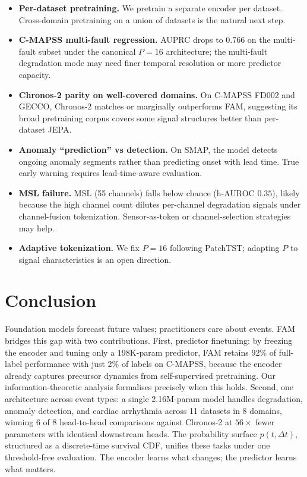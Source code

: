 \documentclass{article}
\begin{document}
\begin{itemize}[nosep]
  \item \textbf{Per-dataset pretraining.} We pretrain a separate encoder per dataset. Cross-domain pretraining on a union of datasets is the natural next step.
  \item \textbf{C-MAPSS multi-fault regression.} AUPRC drops to $0.766$ on the multi-fault subset under the canonical $P{=}16$ architecture; the multi-fault degradation mode may need finer temporal resolution or more predictor capacity.
  \item \textbf{Chronos-2 parity on well-covered domains.} On C-MAPSS FD002 and GECCO, Chronos-2 matches or marginally outperforms FAM, suggesting its broad pretraining corpus covers some signal structures better than per-dataset JEPA.
  \item \textbf{Anomaly ``prediction'' vs detection.} On SMAP, the model detects ongoing anomaly segments rather than predicting onset with lead time. True early warning requires lead-time-aware evaluation.
  \item \textbf{MSL failure.} MSL (55 channels) falls below chance (h-AUROC $0.35$), likely because the high channel count dilutes per-channel degradation signals under channel-fusion tokenization. Sensor-as-token or channel-selection strategies may help.
  \item \textbf{Adaptive tokenization.} We fix $P{=}16$ following PatchTST; adapting $P$ to signal characteristics is an open direction.
\end{itemize}

\section{Conclusion}

Foundation models forecast future values; practitioners care about events. FAM bridges this gap with two contributions. First, predictor finetuning: by freezing the encoder and tuning only a 198K-param predictor, FAM retains 92\% of full-label performance with just 2\% of labels on C-MAPSS, because the encoder already captures precursor dynamics from self-supervised pretraining. Our information-theoretic analysis formalises precisely when this holds. Second, one architecture across event types: a single 2.16M-param model handles degradation, anomaly detection, and cardiac arrhythmia across 11 datasets in 8 domains, winning 6 of 8 head-to-head comparisons against Chronos-2 at $56{\times}$ fewer parameters with identical downstream heads. The probability surface $p(t, \Delta t)$, structured as a discrete-time survival CDF, unifies these tasks under one threshold-free evaluation. The encoder learns what changes; the predictor learns what matters.
\end{document}
